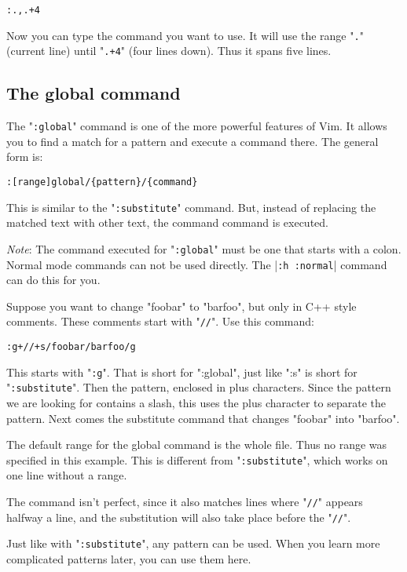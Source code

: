 \begin{Verbatim}[samepage=true]
 :.,.+4
\end{Verbatim}

Now you can type the command you want to use.
It will use the range "\verb!.!" (current line) until "\verb!.+4!" (four lines down).
Thus it spans five lines.

\subsection{The global command}
The "\verb!:global!" command is one of the more powerful features of Vim.
It allows you to find a match for a pattern and execute a command there.
The general form is:

\begin{Verbatim}[samepage=true]
 :[range]global/{pattern}/{command}
\end{Verbatim}

This is similar to the "\verb!:substitute!" command.
But, instead of replacing the matched text with other text, the command {command} is executed.

\emph{Note}:
The command executed for "\verb!:global!" must be one that starts with a colon.
Normal mode commands can not be used directly.
The |\verb!:h :normal!| command can do this for you.

Suppose you want to change "foobar" to "barfoo", but only in C++ style comments.
These comments start with "\verb!//!".
Use this command:

\begin{Verbatim}[samepage=true]
 :g+//+s/foobar/barfoo/g
\end{Verbatim}

This starts with "\verb!:g!".
That is short for ":global", just like ":s" is short for "\verb!:substitute!".
Then the pattern, enclosed in plus characters.
Since the pattern we are looking for contains a slash, this uses the plus character to separate the pattern.
Next comes the substitute command that changes "foobar" into "barfoo".

The default range for the global command is the whole file.
Thus no range was specified in this example.
This is different from "\verb!:substitute!", which works on one line without a range.

The command isn't perfect, since it also matches lines where "\verb!//!" appears halfway a line, and the substitution will also take place before the "\verb!//!".

Just like with "\verb!:substitute!", any pattern can be used.
When you learn more complicated patterns later, you can use them here.
